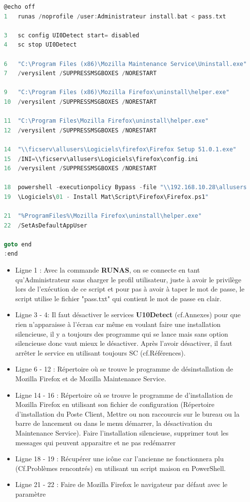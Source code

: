 \documentclass[11pt,a4paper,oneside]{article}
\begin{document}
\begin{lstlisting}[language=C]
@echo off
1	runas /noprofile /user:Administrateur install.bat < pass.txt
	
3	sc config UI0Detect start= disabled
4	sc stop UI0Detect

6	"C:\Program Files (x86)\Mozilla Maintenance Service\Uninstall.exe" 
7	/verysilent /SUPPRESSMSGBOXES /NORESTART
	
9	"C:\Program Files (x86)\Mozilla Firefox\uninstall\helper.exe" 
10	/verysilent /SUPPRESSMSGBOXES /NORESTART
	
11	"C:\Program Files\Mozilla Firefox\uninstall\helper.exe" 
12	/verysilent /SUPPRESSMSGBOXES /NORESTART	

14	"\\ficserv\allusers\Logiciels\firefox\Firefox Setup 51.0.1.exe" 
15	/INI=\\ficserv\allusers\Logiciels\firefox\config.ini 
16	/verysilent /SUPPRESSMSGBOXES /NORESTART
	
18	powershell -executionpolicy Bypass -file "\\192.168.10.28\allusers
19	\Logiciels\01 - Install Mat\Script\Firefox\Firefox.ps1"	
	
21	"%ProgramFiles%\Mozilla Firefox\uninstall\helper.exe" 
22	/SetAsDefaultAppUser
	
goto end
:end	
\end{lstlisting}
\begin{itemize}
	\item Ligne 1 : Avec la commande \textbf{RUNAS}, on se connecte en tant qu'Administrateur sans charger le profil utilisateur, juste à avoir le privilège lors de l'exécution de ce script et pour pas à avoir à taper le mot de passe, le script utilise le fichier "pass.txt" qui contient le mot de passe en clair.
	\item Ligne 3 - 4: Il faut désactiver le services \textbf{U10Detect} (cf.Annexes) pour que rien n'apparaisse à l'écran car  même en voulant faire une installation silencieuse, il y a toujours des programme qui se lance mais sans option silencieuse donc vaut mieux le désactiver. Après l'avoir désactiver, il faut arrêter le service en utilisant toujours SC (cf.Références). 
	\item Ligne 6 - 12 : Répertoire où se trouve le programme de désinstallation de Mozilla Firefox et de Mozilla Maintenance Service.
	\item Ligne 14 - 16 : Répertoire où se trouve le programme de d'installation de Mozilla Firefox en utilisant son fichier de configuration (Répertoire d'installation du Poste Client, Mettre ou non raccourcis sur le bureau ou la barre de lancement ou dans le menu démarrer, la désactivation du Maintenance Service). Faire l'installation silencieuse, supprimer tout les messages qui peuvent apparaitre et ne pas redémarrer
	\item Ligne 18 - 19 : Récupérer une icône car l'ancienne ne fonctionnera plu (Cf.Problèmes rencontrés) en utilisant un script maison en PowerShell.
	\item Ligne 21 - 22 : Faire de Mozilla Firefox le navigateur par défaut avec le paramètre
\end{itemize}
\newpage
\end{document}
